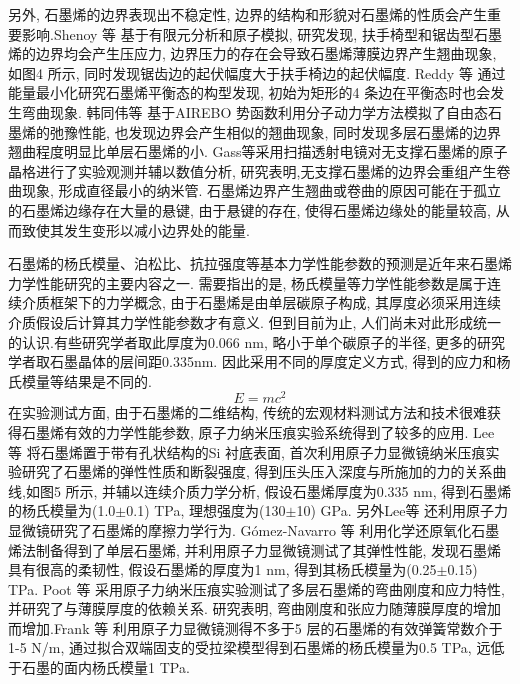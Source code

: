 \documentclass{APS}
\begin{document}
\begin{bicol}
另外, 石墨烯的边界表现出不稳定性, 边界的结构和形貌对石墨烯的性质会产生重要影响.Shenoy 等 基于有限元分析和原子模拟, 研究发现, 扶手椅型和锯齿型石墨烯的边界均会产生压应力, 边界压力的存在会导致石墨烯薄膜边界产生翘曲现象, 如图4 所示, 同时发现锯齿边的起伏幅度大于扶手椅边的起伏幅度. Reddy 等 通过能量最小化研究石墨烯平衡态的构型发现, 初始为矩形的4 条边在平衡态时也会发生弯曲现象. 韩同伟等 基于AIREBO 势函数利用分子动力学方法模拟了自由态石墨烯的弛豫性能, 也发现边界会产生相似的翘曲现象, 同时发现多层石墨烯的边界翘曲程度明显比单层石墨烯的小. Gass等采用扫描透射电镜对无支撑石墨烯的原子晶格进行了实验观测并辅以数值分析, 研究表明,无支撑石墨烯的边界会重组产生卷曲现象, 形成直径最小的纳米管. 石墨烯边界产生翘曲或卷曲的原因可能在于孤立的石墨烯边缘存在大量的悬键, 由于悬键的存在, 使得石墨烯边缘处的能量较高, 从而致使其发生变形以减小边界处的能量.


石墨烯的杨氏模量、泊松比、抗拉强度等基本力学性能参数的预测是近年来石墨烯力学性能研究的主要内容之一. 需要指出的是, 杨氏模量等力学性能参数是属于连续介质框架下的力学概念, 由于石墨烯是由单层碳原子构成, 其厚度必须采用连续介质假设后计算其力学性能参数才有意义. 但到目前为止, 人们尚未对此形成统一的认识.有些研究学者取此厚度为0.066 nm, 略小于单个碳原子的半径, 更多的研究学者取石墨晶体的层间距0.335nm. 因此采用不同的厚度定义方式, 得到的应力和杨氏模量等结果是不同的.
\[E=mc^2\]
在实验测试方面, 由于石墨烯的二维结构, 传统的宏观材料测试方法和技术很难获得石墨烯有效的力学性能参数, 原子力纳米压痕实验系统得到了较多的应用. Lee 等 将石墨烯置于带有孔状结构的Si 衬底表面, 首次利用原子力显微镜纳米压痕实验研究了石墨烯的弹性性质和断裂强度, 得到压头压入深度与所施加的力的关系曲线,如图5 所示, 并辅以连续介质力学分析, 假设石墨烯厚度为0.335 nm, 得到石墨烯的杨氏模量为(1.0$\pm$0.1) TPa, 理想强度为(130$\pm$10) GPa. 另外Lee等 还利用原子力显微镜研究了石墨烯的摩擦力学行为. G\'omez-Navarro 等 利用化学还原氧化石墨烯法制备得到了单层石墨烯, 并利用原子力显微镜测试了其弹性性能, 发现石墨烯具有很高的柔韧性, 假设石墨烯的厚度为1 nm, 得到其杨氏模量为(0.25$\pm$0.15) TPa. Poot 等 采用原子力纳米压痕实验测试了多层石墨烯的弯曲刚度和应力特性, 并研究了与薄膜厚度的依赖关系. 研究表明, 弯曲刚度和张应力随薄膜厚度的增加而增加.Frank 等 利用原子力显微镜测得不多于5 层的石墨烯的有效弹簧常数介于1-5 N/m, 通过拟合双端固支的受拉梁模型得到石墨烯的杨氏模量为0.5 TPa, 远低于石墨的面内杨氏模量1 TPa.
\end{bicol}
\end{document}
